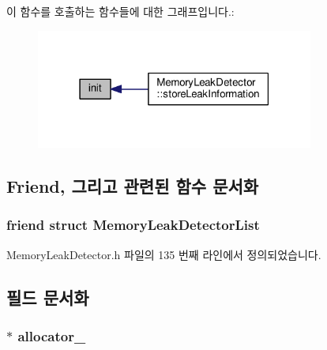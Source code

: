 이 함수를 호출하는 함수들에 대한 그래프입니다.\+:
\nopagebreak
\begin{figure}[H]
\begin{center}
\leavevmode
\includegraphics[width=259pt]{struct_memory_leak_detector_node_aabfd3c84a772881892c1d9e48fa11b7b_icgraph}
\end{center}
\end{figure}




\subsection{Friend, 그리고 관련된 함수 문서화}
\subsubsection[{\texorpdfstring{Memory\+Leak\+Detector\+List}{MemoryLeakDetectorList}}]{\setlength{\rightskip}{0pt plus 5cm}friend struct {\bf Memory\+Leak\+Detector\+List}\hspace{0.3cm}{\ttfamily [friend]}}\hypertarget{struct_memory_leak_detector_node_afbddc710b54bb177a15bbdecd145555d}{}\label{struct_memory_leak_detector_node_afbddc710b54bb177a15bbdecd145555d}


Memory\+Leak\+Detector.\+h 파일의 135 번째 라인에서 정의되었습니다.



\subsection{필드 문서화}
\subsubsection[{\texorpdfstring{allocator\+\_\+}{allocator_}}]{$\ast$ allocator\+\_\+}\hypertarget{struct_memory_leak_detector_node_a12122107c5adfce5f08568d080ad411a}{}\label{struct_memory_leak_detector_node_a12122107c5adfce5f08568d080ad411a}


